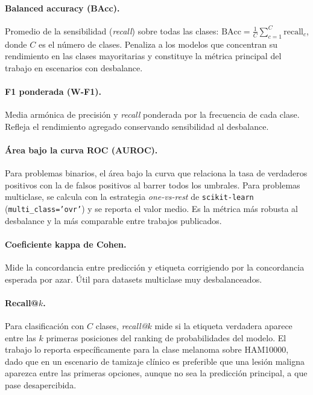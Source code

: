 \paragraph{Balanced accuracy (BAcc).} Promedio de la sensibilidad
(\emph{recall}) sobre todas las clases:
$\mathrm{BAcc}=\frac{1}{C}\sum_{c=1}^{C}\mathrm{recall}_c$,
donde $C$ es el número de clases. Penaliza a los modelos que
concentran su rendimiento en las clases mayoritarias y constituye
la métrica principal del trabajo en escenarios con desbalance.

\paragraph{F1 ponderada (W-F1).} Media armónica de precisión y
\emph{recall} ponderada por la frecuencia de cada clase. Refleja
el rendimiento agregado conservando sensibilidad al desbalance.

\paragraph{Área bajo la curva ROC (AUROC).} Para problemas
binarios, el área bajo la curva que relaciona la tasa de
verdaderos positivos con la de falsos positivos al barrer todos
los umbrales. Para problemas multiclase, se calcula con la
estrategia \emph{one-vs-rest} de \texttt{scikit-learn}
(\texttt{multi\_class='ovr'}) y se reporta el valor medio. Es la
métrica más robusta al desbalance y la más comparable entre
trabajos publicados.

\paragraph{Coeficiente kappa de Cohen.} Mide la concordancia entre
predicción y etiqueta corrigiendo por la concordancia esperada por
azar. Útil para datasets multiclase muy desbalanceados.

\paragraph{Recall@$k$.} Para clasificación con $C$ clases,
\emph{recall@$k$} mide si la etiqueta verdadera aparece entre las
$k$ primeras posiciones del ranking de probabilidades del modelo.
El trabajo lo reporta específicamente para la clase melanoma
sobre HAM10000, dado que en un escenario de tamizaje clínico es
preferible que una lesión maligna aparezca entre las primeras
opciones, aunque no sea la predicción principal, a que pase
desapercibida.

